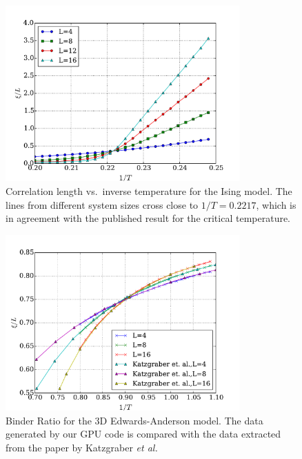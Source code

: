   \begin{figure}[ht!]
    \centering
    \includegraphics[width=0.8\textwidth]{img/ising_corr.pdf}
    \caption{Correlation length vs.\ inverse temperature for the Ising model. The lines from different system sizes cross
    close to $1/T=0.2217$, which is in agreement with the published result for the critical temperature.~\cite{PhysRevB.44.5081}}
    \label{fig:corr-ising}
    \end{figure}

  \begin{figure}[ht!]
    \centering
    \includegraphics[width=0.8\textwidth]{img/binder_compare.pdf}
    \caption{Binder Ratio for the 3D Edwards-Anderson model. The data generated by our GPU code is compared 
    with the data extracted from the paper by Katzgraber {\it et al.} \cite{2006PhRvB..73v4432K}}
    \label{fig:binder-ea}
    \end{figure}


